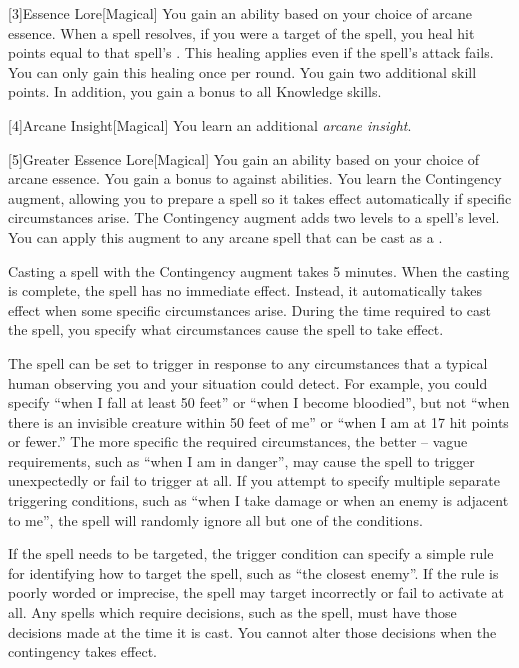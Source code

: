         [3]{Essence Lore}[Magical]
        You gain an ability based on your choice of arcane essence.
         When a spell resolves, if you were a target of the spell, you heal hit points equal to that spell's .
        This healing applies even if the spell's attack fails.
        You can only gain this healing once per round.
         You gain two additional skill points.
        In addition, you gain a  bonus to all Knowledge skills.

        [4]{Arcane Insight}[Magical]
        You learn an additional \textit{arcane insight}.

        [5]{Greater Essence Lore}[Magical]
        You gain an ability based on your choice of arcane essence.
         You gain a  bonus to  against  abilities.
         You learn the Contingency augment, allowing you to prepare a spell so it takes effect automatically if specific circumstances arise.
        The Contingency augment adds two levels to a spell's level.
        You can apply this augment to any arcane spell that can be cast as a .

        Casting a spell with the Contingency augment takes 5 minutes.
        When the casting is complete, the spell has no immediate effect.
        Instead, it automatically takes effect when some specific circumstances arise.
        During the time required to cast the spell, you specify what circumstances cause the spell to take effect.

        The spell can be set to trigger in response to any circumstances that a typical human observing you and your situation could detect.
        For example, you could specify ``when I fall at least 50 feet'' or ``when I become bloodied'', but not ``when there is an invisible creature within 50 feet of me'' or ``when I am at 17 hit points or fewer.''
        The more specific the required circumstances, the better -- vague requirements, such as ``when I am in danger'', may cause the spell to trigger unexpectedly or fail to trigger at all.
        If you attempt to specify multiple separate triggering conditions, such as ``when I take damage or when an enemy is adjacent to me'', the spell will randomly ignore all but one of the conditions.

        If the spell needs to be targeted, the trigger condition can specify a simple rule for identifying how to target the spell, such as ``the closest enemy''.
        If the rule is poorly worded or imprecise, the spell may target incorrectly or fail to activate at all.
        Any spells which require decisions, such as the  spell, must have those decisions made at the time it is cast.
        You cannot alter those decisions when the contingency takes effect.

